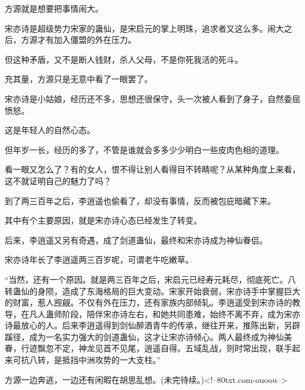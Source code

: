 \begin{this_body}
方源就是想要把事情闹大。

宋亦诗是超级势力宋家的蛊仙，是宋启元的掌上明珠，追求者又这么多。闹大之后，方源才有加入僵盟的外在压力。

但这种矛盾，又不是断人钱财，杀人父母，不是你死我活的死斗。

充其量，方源只是无意中看了一眼罢了。

宋亦诗是小姑娘，经历还不多，思想还很保守，头一次被人看到了身子，自然委屈愤怒。

这是年轻人的自然心态。

但年岁一长，经历的多了，不管是谁就会多多少少明白一些皮肉色相的道理。

看一眼又怎么了？有的女人，恨不得让别人看得目不转睛呢？从某种角度上来看，这不就证明自己的魅力了吗？

到了两三百年之后，李逍遥也偷看了，却没有事情，反而被包庇暗藏下来。

其中有个主要原因，就是宋亦诗心态已经发生了转变。

后来，李逍遥又另有奇遇，成了剑道蛊仙，最终和宋亦诗成为神仙眷侣。

宋亦诗年长了李逍遥两三百岁呢，可谓老牛吃嫩草。

“当然，还有一个原因。就是两三百年之后，宋启元已经寿元耗尽，彻底死亡。八转蛊仙的身陨，造成了东海格局的巨大变动。宋家开始衰弱，宋亦诗手中掌握巨大的财富，惹人觊觎。不仅有外在压力，还有家族内部倾轧。李逍遥受到宋亦诗的教导，在凡人蛊师阶段，陪伴宋亦诗左右，和她共同患难，始终不离不弃，成为宋亦诗最放心的人。后来李逍遥得到剑仙醉酒青牛的传承，继往开来，推陈出新，另辟蹊径，成为一名实力强大的剑道蛊仙，这才让宋亦诗倾心。两人最终成为神仙美眷，行迹飘忽不定，神龙见首不见尾，逍遥自得。五域乱战，则时常出现，联手起来可抗八转，是抵挡中洲攻势的一大支柱。”

方源一边奔逃，一边还有闲暇在胡思乱想。(未完待续。)<!--80txt.com-ouoou-->

\end{this_body}

